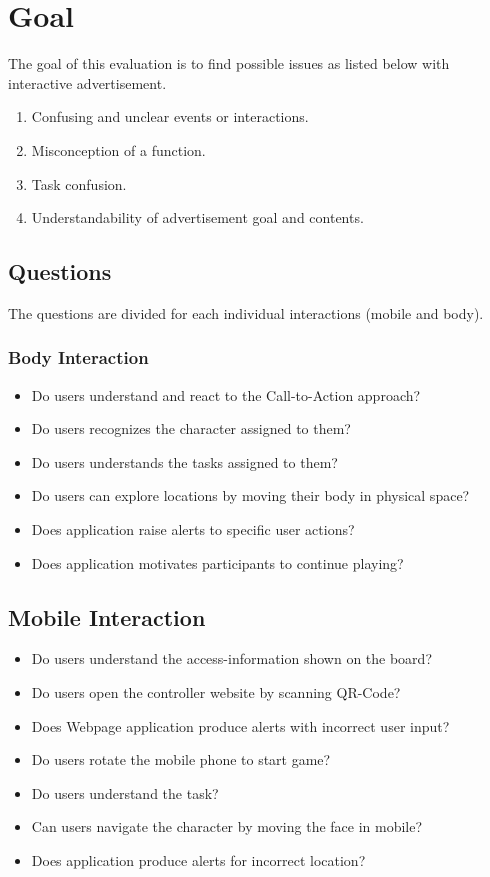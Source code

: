 \section{Goal}
The goal of this evaluation is to find possible issues as listed below with interactive advertisement. 

\begin{enumerate}
\item   Confusing and unclear events or interactions.
\item   Misconception of a function.
\item   Task confusion.
\item   Understandability of advertisement goal and contents.
\end{enumerate}


\subsection{Questions}
The questions are divided for each individual interactions (mobile and body).

\subsubsection{Body Interaction}

\begin{itemize}
\item  Do users understand and react to the Call-to-Action approach?
\item  Do users recognizes the character assigned to them?
\item  Do users understands the tasks assigned to them?
\item  Do users can explore locations by moving their body in physical space?
\item  Does application raise alerts to specific user actions?
\item  Does application motivates participants to continue playing?
\end{itemize}

\subsection{Mobile Interaction}

\begin{itemize}
\item Do users understand the access-information shown on the board?
\item Do users open the controller website by scanning QR-Code?
\item Does Webpage application produce alerts with incorrect user input?
\item Do users rotate the mobile phone to start game?
\item Do users understand the task?
\item Can users navigate the character by moving the face in mobile?
\item Does application produce alerts for incorrect location?
\end{itemize}


